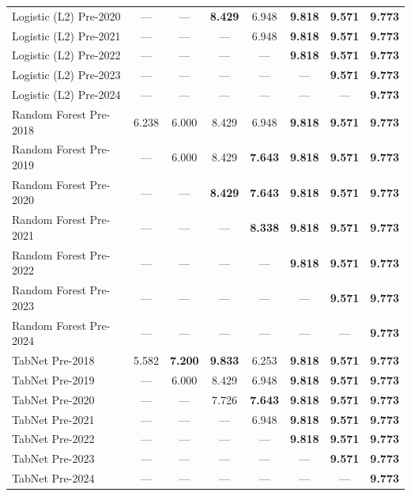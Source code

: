 \begin{table}[htbp]
{\begin{tabular}{lccccccc}
Logistic (L2) Pre-2020 & --- & --- & \textbf{8.429} & 6.948 & \textbf{9.818} & \textbf{9.571} & \textbf{9.773} \\
Logistic (L2) Pre-2021 & --- & --- & --- & 6.948 & \textbf{9.818} & \textbf{9.571} & \textbf{9.773} \\
Logistic (L2) Pre-2022 & --- & --- & --- & --- & \textbf{9.818} & \textbf{9.571} & \textbf{9.773} \\
Logistic (L2) Pre-2023 & --- & --- & --- & --- & --- & \textbf{9.571} & \textbf{9.773} \\
Logistic (L2) Pre-2024 & --- & --- & --- & --- & --- & --- & \textbf{9.773} \\
Random Forest Pre-2018 & 6.238 & 6.000 & 8.429 & 6.948 & \textbf{9.818} & \textbf{9.571} & \textbf{9.773} \\
Random Forest Pre-2019 & --- & 6.000 & 8.429 & \textbf{7.643} & \textbf{9.818} & \textbf{9.571} & \textbf{9.773} \\
Random Forest Pre-2020 & --- & --- & \textbf{8.429} & \textbf{7.643} & \textbf{9.818} & \textbf{9.571} & \textbf{9.773} \\
Random Forest Pre-2021 & --- & --- & --- & \textbf{8.338} & \textbf{9.818} & \textbf{9.571} & \textbf{9.773} \\
Random Forest Pre-2022 & --- & --- & --- & --- & \textbf{9.818} & \textbf{9.571} & \textbf{9.773} \\
Random Forest Pre-2023 & --- & --- & --- & --- & --- & \textbf{9.571} & \textbf{9.773} \\
Random Forest Pre-2024 & --- & --- & --- & --- & --- & --- & \textbf{9.773} \\
TabNet Pre-2018 & 5.582 & \textbf{7.200} & \textbf{9.833} & 6.253 & \textbf{9.818} & \textbf{9.571} & \textbf{9.773} \\
TabNet Pre-2019 & --- & 6.000 & 8.429 & 6.948 & \textbf{9.818} & \textbf{9.571} & \textbf{9.773} \\
TabNet Pre-2020 & --- & --- & 7.726 & \textbf{7.643} & \textbf{9.818} & \textbf{9.571} & \textbf{9.773} \\
TabNet Pre-2021 & --- & --- & --- & 6.948 & \textbf{9.818} & \textbf{9.571} & \textbf{9.773} \\
TabNet Pre-2022 & --- & --- & --- & --- & \textbf{9.818} & \textbf{9.571} & \textbf{9.773} \\
TabNet Pre-2023 & --- & --- & --- & --- & --- & \textbf{9.571} & \textbf{9.773} \\
TabNet Pre-2024 & --- & --- & --- & --- & --- & --- & \textbf{9.773} \\

\end{tabular}}
\end{table}
